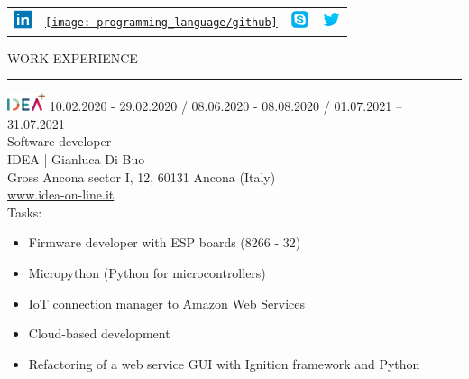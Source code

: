 \documentclass[letterpaper, 11pt]{article}
\begin{document}
\begin{minipage}[t]{\linewidth}
\begin{minipage}[ht]{0.5\linewidth}
        \vspace{7em}
        
        \begin{tabular}[l]{llll}
        \href{https://www.linkedin.com/in/jeferson-morales-mariciano}{\includegraphics[width=1.5em]{logo/linkedin}}
        &
        \href{https://github.com/JekxDevil}
        {\texttt{[image: programming\_language/github]}} 
        &
        \href{https://join.skype.com/invite/dF93ltUFnj0T}
        {\includegraphics[width=1.5em]{logo/skype}} 
        &
        \href{https://twitter.com/jekx123devil?t=QBCTKEW_qbXW735jlEijZA&s=09}
        {\includegraphics[width=1.5em]{logo/twitter}}
        \end{tabular}

        \vspace{-5em}
        
    \end{minipage}
\end{minipage}
\bigskip\newline
\textcolor{titlecolor}{WORK EXPERIENCE}
{\color{linecolor} \rule{0.8\linewidth}{0.5mm}}
\bigskip\newline
\includegraphics[width=3em]{logo/idea}
10.02.2020 - 29.02.2020 / 08.06.2020 - 08.08.2020 / 01.07.2021 – 31.07.2021\\
Software developer\\
IDEA | Gianluca Di Buo\'\\
Gross Ancona sector I, 12, 60131 Ancona (Italy)\\
\href{https://www.idea-on-line.it/}
{\textcolor{linked}{www.idea-on-line.it}}\\
Tasks:
\vspace{-0.7em}
\begin{itemize}
\setlength{\itemsep}{1.2pt}
    \setlength{\parskip}{0.2pt}
    \setlength{\parsep}{0pt}
    \item Firmware developer with ESP boards (8266 - 32)
    \item Micropython (Python for microcontrollers)
    \item IoT connection manager to Amazon Web Services
    \item Cloud-based development
    \item Refactoring of a web service GUI with Ignition framework and Python
\end{itemize}
\end{document}
